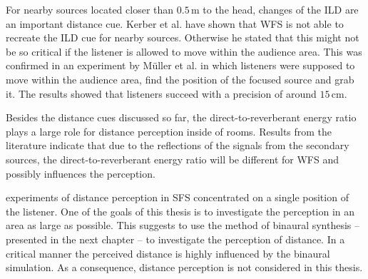 For nearby sources located closer than $0.5$\,m to the head, changes of the
\ac{ILD} are an important distance cue.\autocite{Brungart1999}
Kerber et al. have shown that \ac{WFS} is not able to recreate the \ac{ILD}
cue for nearby sources.\autocite{Kerber2004}
Otherwise he stated that this might not be so critical if the listener is allowed to
move within the audience area. This was confirmed in an experiment by Müller
et al. in which listeners were supposed to move within the audience area, find the
position of the focused source and grab it.\autocite{Muller2014} The results showed
that listeners succeed with a precision of around $15$\,cm.

Besides the distance cues discussed so far, the direct-to-reverberant energy
ratio plays a large role for distance perception inside of
rooms.\autocite{Bronkhorst1999}
Results from the literature indicate that due to the reflections of the signals
from the secondary sources, the direct-to-reverberant energy ratio will be
different for \ac{WFS} and possibly influences the perception.\autocite{Volk2010a}

 experiments of distance perception in \ac{SFS}
concentrated on a
single position of the listener. One of the goals of this thesis is to investigate the
perception in an area as large as possible. This suggests to use the method of
binaural synthesis -- presented in the next chapter -- to investigate the
perception of distance. In a critical manner the perceived distance is highly
influenced by the binaural simulation.
As a consequence, distance perception is not considered in this thesis.


